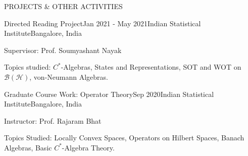\documentclass{resume} %
\begin{document}
\begin{rSection}{PROJECTS \& OTHER ACTIVITIES}
	
	\begin{rSubsection}{Directed Reading Project}{Jan 2021 - May 2021}{Indian Statistical Institute}{Bangalore, India}
		\item Supervisor: Prof. Soumyashant Nayak
		\item Topics studied: $C^*$-Algebras, States and Representations, SOT and WOT on $\mathcal{B}(\mathcal{H})$, von-Neumann Algebras.
	\end{rSubsection}

	\begin{rSubsection}{Graduate Course Work: Operator Theory}{Sep 2020}{Indian Statistical Institute}{Bangalore, India}
		\item Instructor: Prof. Rajaram Bhat
		\item Topics Studied: Locally Convex Spaces, Operators on Hilbert Spaces, Banach Algebras, Basic $C^*$-Algebra Theory.
	\end{rSubsection}

\end{rSection}
\end{document}
